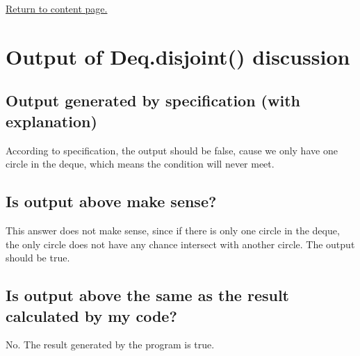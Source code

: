 \documentclass[12pt]{article}
\begin{document}
\vskip 10cm
\hyperlink{toc}{Return to content page.}

\section{Output of Deq.disjoint() discussion}

  \subsection{Output generated by specification (with explanation)}
  According to specification, the output should be false, cause we
  only have one circle in the deque, which means the condition will
  never meet.

  \subsection{Is output above make sense?}
  This answer does not make sense, since if there is only one circle
  in the deque, the only circle does not have any chance intersect
  with another circle. The output should be true.

  \subsection{Is output above the same as the result calculated by my code?}
  No. The result generated by the program is true.
\end{document}
